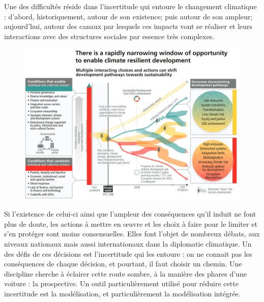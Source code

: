 Une des difficultés réside dans l'incertitude qui entoure le changement climatique : d'abord, historiquement, autour de son existence; puis autour de son ampleur; aujourd'hui, autour des canaux par lesquels ces impacts vont se réaliser et leurs interactions avec des structures sociales par essence très complexes. 

\begin{figure}[h!]
    \centering
    \includegraphics[width=\linewidth]{figures/trajectoire_spm6.png}
    \label{fig:pathways}
\end{figure}

Si l'existence de celui-ci ainsi que l'ampleur des conséquences qu'il induit ne font plus de doute, les actions à mettre en œuvre et les choix à faire pour le limiter et s'en protéger sont moins consensuelles. Elles font l'objet de nombreux débats, aux niveaux nationaux mais aussi internationaux dans la diplomatie climatique. Un des défis de ces décisions est l'incertitude qui les entoure : on ne connait pas les conséquences de chaque décision, et pourtant, il faut choisir un chemin. Une discipline cherche à éclairer cette route sombre, à la manière des phares d'une voiture : la prospective. Un outil particulièrement utilisé pour réduire cette incertitude est la modélisation, et particulièrement la modélisation intégrée. \\

